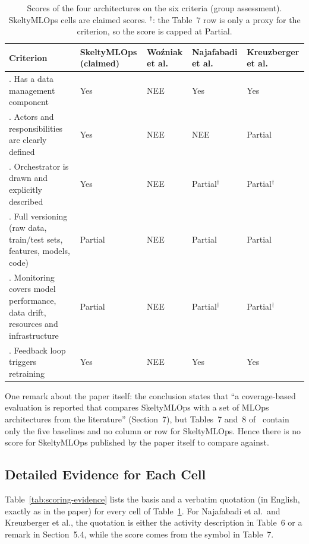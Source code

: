 \documentclass[11pt,a4paper]{article}
\begin{document}
\begin{table}[htbp]
\centering
\small
\caption{Scores of the four architectures on the six criteria (group assessment). SkeltyMLOps cells are claimed scores. $^{\dagger}$: the Table~7 row is only a proxy for the criterion, so the score is capped at Partial.}
\label{tab:scoring-summary}
\begin{tabular}{@{}>{\raggedright\arraybackslash}p{3.9cm} >{\centering\arraybackslash}p{2.5cm} >{\centering\arraybackslash}p{2.2cm} >{\centering\arraybackslash}p{2.2cm} >{\centering\arraybackslash}p{2.3cm}@{}}
\toprule
Criterion & SkeltyMLOps (claimed) & Wo\'{z}niak et al. & Najafabadi et al. & Kreuzberger et al. \\
\midrule
1. Has a data management component & Yes & NEE & Yes & Yes \\
2. Actors and responsibilities are clearly defined & Yes & NEE & NEE & Partial \\
3. Orchestrator is drawn and explicitly described & Yes & NEE & Partial$^{\dagger}$ & Partial$^{\dagger}$ \\
4. Full versioning (raw data, train/test sets, features, models, code) & Partial & NEE & Partial & Partial \\
5. Monitoring covers model performance, data drift, resources and infrastructure & Partial & NEE & Partial$^{\dagger}$ & Partial$^{\dagger}$ \\
6. Feedback loop triggers retraining & Yes & NEE & Yes & Yes \\
\bottomrule
\end{tabular}
\end{table}

One remark about the paper itself: the conclusion states that ``a coverage-based evaluation is reported that compares SkeltyMLOps with a set of MLOps architectures from the literature'' (Section~7), but Tables~7 and~8 of~\papercite{} contain only the five baselines and no column or row for SkeltyMLOps. Hence there is no score for SkeltyMLOps published by the paper itself to compare against.

\subsection{Detailed Evidence for Each Cell}

Table~\ref{tab:scoring-evidence} lists the basis and a verbatim quotation (in English, exactly as in the paper) for every cell of Table~\ref{tab:scoring-summary}. For Najafabadi et al.\ and Kreuzberger et al., the quotation is either the activity description in Table~6 or a remark in Section~5.4, while the score comes from the symbol in Table~7.
\end{document}
